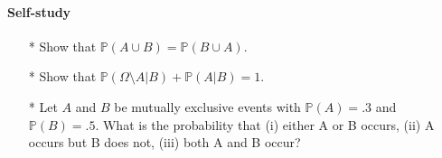 \documentclass{article}
\begin{document}
\paragraph{Self-study}
\begin{enumerate}
\item[*] Show that $\mathbb{P}(A \cup B) = \mathbb{P}(B \cup A)$.
\item[*] Show that $\mathbb{P}(\Omega \setminus A|B) + \mathbb{P}(A|B) = 1$.
\item[*] Let $A$ and $B$ be mutually exclusive events with $\mathbb{P}(A) = .3$ and $\mathbb{P}(B) = .5$. What is the probability that (i) either A or B occurs, (ii) A occurs but B does not, (iii) both A and B occur?
\end{enumerate}
\end{document}
